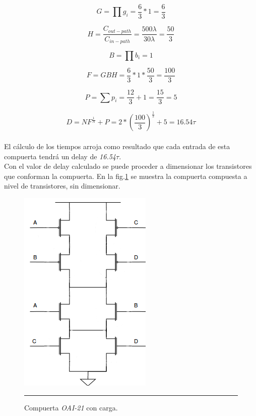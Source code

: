 \documentclass[12pt,a4paper]{article} %
\begin{document}
\begin{equation}\label{eqn:esfuerzo_logico2}
G= \prod g_{i}= \frac{6}{3} * 1 = \frac{6}{3}
\end{equation}

\begin{equation}\label{eqn:esfuerzo_electrico2}
H= \frac{C_{out-path}}{C_{in-path}} = \frac{500\lambda}{30\lambda} = \frac{50}{3}
\end{equation}

\begin{equation}\label{eqn:esfuerzo_enramado2}
B= \prod b_{i} = 1
\end{equation}

\begin{equation}\label{eqn:esfuerzo2}
F = GBH = \frac{6}{3}*1*\frac{50}{3} = \frac{100}{3}
\end{equation}

\begin{equation}\label{eqn:delay_parasitico2}
P = \sum p_{i} = \frac{12}{3} + 1 = \frac{15}{3} = 5
\end{equation}

\begin{equation}\label{eqn:delay2}
D = NF^{\frac{1}{N}} + P = 2*(\frac{100}{3})^{\frac{1}{2}} + 5 = 16.54\tau
\end{equation}\\

El cálculo de los tiempos arroja como resultado que cada entrada de esta compuerta tendrá un delay de \textit{16.54$\tau$}.\\

Con el valor de delay calculado se puede proceder a dimensionar los transistores que conforman la compuerta. En la fig.\ref{fig:Comp_Transistores} se muestra la compuerta compuesta a nivel de transistores, sin dimensionar.\\

\begin{figure}[htbp]
  \centering
    \includegraphics[scale=0.5]{./Comp_Transistores.png}
    \rule{35em}{0.5pt}
  \caption[IdealvsSim]{Compuerta \textit{OAI-21} con carga.}
  \label{fig:Comp_Transistores}
\end{figure}\\
\end{document}
